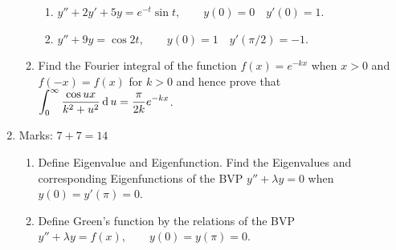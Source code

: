 \documentclass[../main-sheet.tex]{subfiles}
\begin{document}
\begin{enumerate}
\begin{enumerate}
\begin{enumerate}[label=(\roman*)]
            \item $\displaystyle y''+2y'+5y=e^{-t}\sin t,\qquad y(0)=0\quad y'(0)=1 $.
            \item $\displaystyle y''+9y=\cos 2t,\qquad y(0)=1\quad y'(\pi/2)=-1 $.
        \end{enumerate}
        \item Find the Fourier integral of the function $\displaystyle f(x)=e^{-kx} $ when $ x> 0 $ and $ f(-x)=f(x) $ for $ k>0 $ and hence prove that $ \displaystyle \int_0^\infty\frac{\cos ux}{k^2+u^2}\,\mathrm{d}\, u=\frac{\pi}{2k}e^{-kx} $.
    \end{enumerate}
    \item Marks: $ 7+7=14 $
    \begin{enumerate}
        \item Define Eigenvalue and Eigenfunction. Find the Eigenvalues and corresponding Eigenfunctions of the BVP $ y''+\lambda y=0 $ when $ y(0)=y'(\pi)=0 $.
        \item Define Green's function by the relations of the BVP $ y''+\lambda y=f(x),\qquad y(0)=y(\pi)=0 $.
    \end{enumerate}
\end{enumerate}
\newpage
\end{document}
